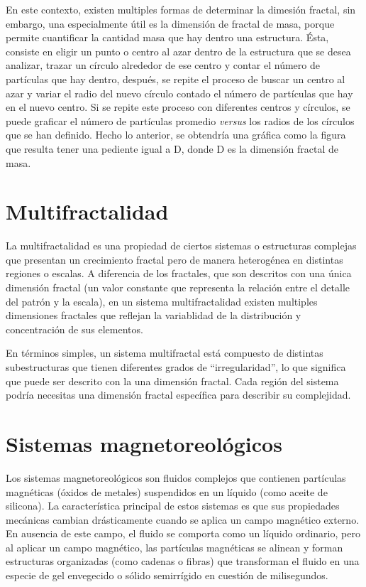 En este contexto, existen multiples formas de determinar la dimesi\'{o}n fractal, sin embargo, una especialmente \'{u}til es la dimensi\'{o}n de fractal de masa, porque permite cuantificar la cantidad masa que hay dentro una estructura. \'{E}sta, consiste en eligir un punto o centro al azar dentro de la estructura que se desea analizar, trazar un c\'{i}rculo alrededor de ese centro y contar el n\'{u}mero de part\'{i}culas que hay dentro, despu\'{e}s, se repite el proceso de buscar un centro al azar y variar el radio del nuevo c\'{i}rculo contado el n\'{u}mero de part\'{i}culas que hay en el nuevo centro. Si se repite este proceso con diferentes centros y c\'{i}rculos, se puede graficar el n\'{u}mero de part\'{i}culas promedio \textit{versus} los radios de los c\'{i}rculos que se han definido. Hecho lo anterior, se obtendr\'{i}a una gr\'{a}fica como la figura que resulta tener una pediente igual a D, donde D es la dimensi\'{o}n fractal de masa. 

\section{Multifractalidad}

La multifractalidad es una propiedad de ciertos sistemas o estructuras complejas que presentan un crecimiento fractal pero de manera heterog\'{e}nea en distintas regiones o escalas. A diferencia de los fractales, que son descritos con una \'{u}nica dimensi\'{o}n fractal (un valor constante que representa la relaci\'{o}n entre el detalle del patr\'{o}n y la escala), en un sistema multifractalidad existen multiples dimensiones fractales que reflejan la variablidad de la distribuci\'{o}n y concentraci\'{o}n de sus elementos. 

En t\'{e}rminos simples, un sistema multifractal est\'{a} compuesto de distintas subestructuras que tienen diferentes grados de ``irregularidad'', lo que significa que puede ser descrito con la una dimensi\'{o}n fractal. Cada regi\'{o}n del sistema podr\'{i}a necesitas una dimensi\'{o}n fractal espec\'{i}fica para describir su complejidad.


\section{Sistemas magnetoreol\'{o}gicos}

Los sistemas magnetoreol\'{o}gicos son fluidos complejos que contienen part\'{i}culas magn\'{e}ticas (\'{o}xidos de metales) suspendidos en un l\'{i}quido (como aceite de silicona). La caracter\'{i}stica principal de estos sistemas es que sus propiedades mec\'{a}nicas cambian dr\'{a}sticamente cuando se aplica un campo magn\'{e}tico externo. En ausencia de este campo, el ﬂuido se comporta como un l\'{i}quido ordinario, pero al aplicar un campo magn\'{e}tico, las part\'{i}culas magn\'{e}ticas se alinean y forman estructuras organizadas (como cadenas o ﬁbras) que transforman el ﬂuido en una especie de gel envegecido o s\'{o}lido semirr\'{i}gido en cuesti\'{o}n de milisegundos. 


